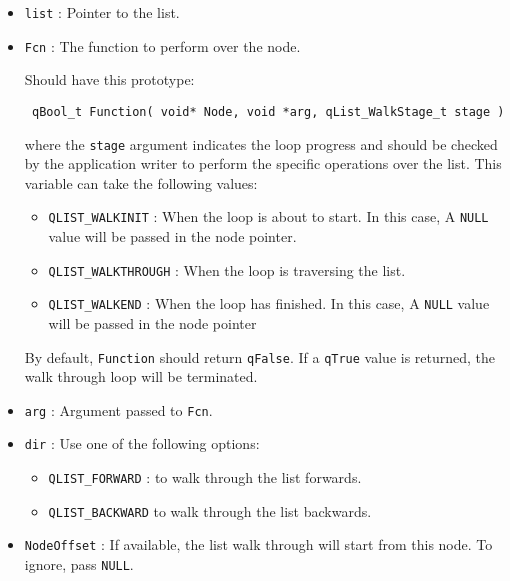 \begin{itemize}
    \item \lstinline{list} : Pointer to the list.
    \item \lstinline{Fcn} : The function to perform over the node. 
                            
                            Should have this prototype:
                            
                            \lstinline{ qBool_t Function( void* Node, void *arg, qList_WalkStage_t stage ) }
                            
                            where the \lstinline{stage} argument indicates the loop progress and should be checked by the application writer to perform the specific operations over the list. This variable can take the following values:
                            
                            \begin{itemize}
                                \item \lstinline{QLIST_WALKINIT} : When the loop is about to start. In this case, A \lstinline{NULL} value will be passed in the node pointer.
                                \item \lstinline{QLIST_WALKTHROUGH} : When the loop is traversing the list.
                                \item \lstinline{QLIST_WALKEND} :  When the loop has finished. In this case, A \lstinline{NULL} value will be passed in the node pointer
                            \end{itemize}
                            
                            By default, \lstinline{Function} should return \lstinline{qFalse}. If a \lstinline{qTrue} value is returned, the walk through loop will be terminated.
    \item \lstinline{arg} : Argument passed to \lstinline{Fcn}.
    \item \lstinline{dir} : Use one of the following options:
                            \begin{itemize}
                                \item \lstinline{QLIST_FORWARD} : to walk through the list forwards.
                                \item \lstinline{QLIST_BACKWARD} to walk through the list backwards.
                            \end{itemize}
    \item \lstinline{NodeOffset} : If available, the list walk through will start from this node.  
                   To ignore, pass \lstinline{NULL}.
\end{itemize}

